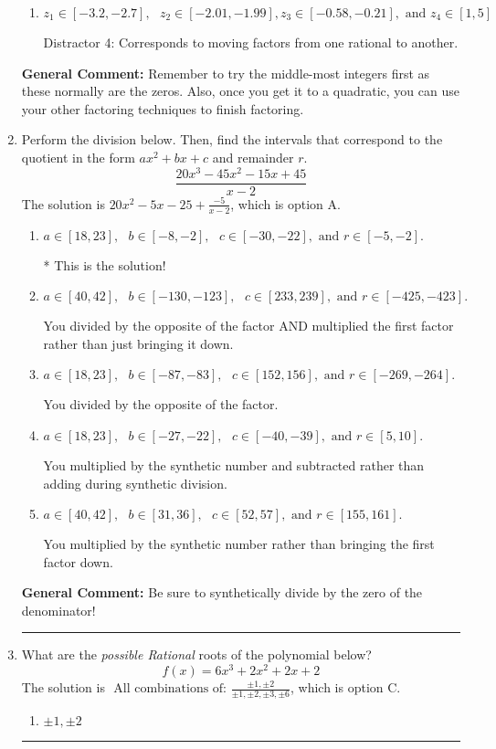 \documentclass{extbook}[14pt]
\newcommand{\litem}[1]{\item #1

\rule{\textwidth}{0.4pt}}
\begin{document}
\begin{enumerate}
{\begin{enumerate}[label=\Alph*.]
 Distractor 3: Corresponds to negatives of all zeros AND inversing rational roots.
\item \( z_1 \in [-3.2, -2.7], \text{   }  z_2 \in [-2.01, -1.99], z_3 \in [-0.58, -0.21], \text{   and   } z_4 \in [1, 5] \)

 Distractor 4: Corresponds to moving factors from one rational to another.
\end{enumerate}

\textbf{General Comment:} Remember to try the middle-most integers first as these normally are the zeros. Also, once you get it to a quadratic, you can use your other factoring techniques to finish factoring.
}
\litem{
Perform the division below. Then, find the intervals that correspond to the quotient in the form $ax^2+bx+c$ and remainder $r$.
\[ \frac{20x^{3} -45 x^{2} -15 x + 45}{x -2} \]The solution is \( 20x^{2} -5 x -25 + \frac{-5}{x -2} \), which is option A.\begin{enumerate}[label=\Alph*.]
\item \( a \in [18, 23], \text{   } b \in [-8, -2], \text{   } c \in [-30, -22], \text{   and   } r \in [-5, -2]. \)

* This is the solution!
\item \( a \in [40, 42], \text{   } b \in [-130, -123], \text{   } c \in [233, 239], \text{   and   } r \in [-425, -423]. \)

 You divided by the opposite of the factor AND multiplied the first factor rather than just bringing it down.
\item \( a \in [18, 23], \text{   } b \in [-87, -83], \text{   } c \in [152, 156], \text{   and   } r \in [-269, -264]. \)

 You divided by the opposite of the factor.
\item \( a \in [18, 23], \text{   } b \in [-27, -22], \text{   } c \in [-40, -39], \text{   and   } r \in [5, 10]. \)

 You multiplied by the synthetic number and subtracted rather than adding during synthetic division.
\item \( a \in [40, 42], \text{   } b \in [31, 36], \text{   } c \in [52, 57], \text{   and   } r \in [155, 161]. \)

 You multiplied by the synthetic number rather than bringing the first factor down.
\end{enumerate}

\textbf{General Comment:} Be sure to synthetically divide by the zero of the denominator!
}
\litem{
What are the \textit{possible Rational} roots of the polynomial below?
\[ f(x) = 6x^{3} +2 x^{2} +2 x + 2 \]The solution is \( \text{ All combinations of: }\frac{\pm 1,\pm 2}{\pm 1,\pm 2,\pm 3,\pm 6} \), which is option C.\begin{enumerate}[label=\Alph*.]
\item \( \pm 1,\pm 2 \)


\end{enumerate}}
\end{enumerate}
\end{document}
